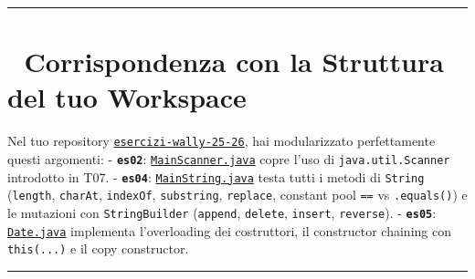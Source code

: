\documentclass[11pt,a4paper,oneside]{report}
\newcommand{\passthrough}[1]{#1}
\begin{document}
\begin{center}\rule{0.5\linewidth}{0.5pt}\end{center}

\section{🔄 Corrispondenza con la Struttura del tuo
Workspace}\label{chap06_corrispondenza-con-la-struttura-del-tuo-workspace}

Nel tuo repository
\href{file:///home/wally/Documenti/GitHub/Programmazione-II/25-26/esercizi-wally-25-26}{\passthrough{\lstinline!esercizi-wally-25-26!}},
hai modularizzato perfettamente questi argomenti: -
\textbf{\passthrough{\lstinline!es02!}}:
\href{file:///home/wally/Documenti/GitHub/Programmazione-II/25-26/esercizi-wally-25-26/es02/src/main/java/es02/MainScanner.java}{\passthrough{\lstinline!MainScanner.java!}}
copre l'uso di \passthrough{\lstinline!java.util.Scanner!} introdotto in
T07. - \textbf{\passthrough{\lstinline!es04!}}:
\href{file:///home/wally/Documenti/GitHub/Programmazione-II/25-26/esercizi-wally-25-26/es04/src/main/java/es04/MainString.java}{\passthrough{\lstinline!MainString.java!}}
testa tutti i metodi di \passthrough{\lstinline!String!}
(\passthrough{\lstinline!length!}, \passthrough{\lstinline!charAt!},
\passthrough{\lstinline!indexOf!}, \passthrough{\lstinline!substring!},
\passthrough{\lstinline!replace!}, constant pool
\passthrough{\lstinline!==!} vs \passthrough{\lstinline!.equals()!}) e
le mutazioni con \passthrough{\lstinline!StringBuilder!}
(\passthrough{\lstinline!append!}, \passthrough{\lstinline!delete!},
\passthrough{\lstinline!insert!}, \passthrough{\lstinline!reverse!}). -
\textbf{\passthrough{\lstinline!es05!}}:
\href{file:///home/wally/Documenti/GitHub/Programmazione-II/25-26/esercizi-wally-25-26/es05/src/main/java/es05/Date.java}{\passthrough{\lstinline!Date.java!}}
implementa l'overloading dei costruttori, il constructor chaining con
\passthrough{\lstinline!this(...)!} e il copy constructor.

\begin{center}\rule{0.5\linewidth}{0.5pt}\end{center}
\end{document}
